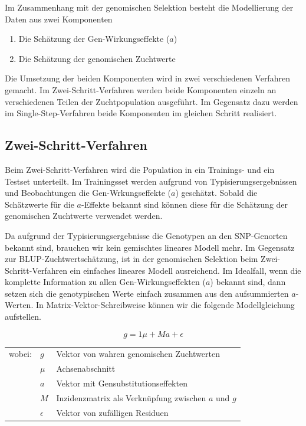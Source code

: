 \documentclass[]{book}
\providecommand{\tightlist}{%
  \setlength{\itemsep}{0pt}\setlength{\parskip}{0pt}}
\begin{document}
Im Zusammenhang mit der genomischen Selektion besteht die Modellierung
der Daten aus zwei Komponenten

\begin{enumerate}
\def\labelenumi{\arabic{enumi}.}
\tightlist
\item
  Die Schätzung der Gen-Wirkungseffekte (\(a\))
\item
  Die Schätzung der genomischen Zuchtwerte
\end{enumerate}

Die Umsetzung der beiden Komponenten wird in zwei verschiedenen
Verfahren gemacht. Im Zwei-Schritt-Verfahren werden beide Komponenten
einzeln an verschiedenen Teilen der Zuchtpopulation ausgeführt. Im
Gegensatz dazu werden im Single-Step-Verfahren beide Komponenten im
gleichen Schritt realisiert.

\subsection{Zwei-Schritt-Verfahren}\label{zwei-schritt-verfahren}

Beim Zwei-Schritt-Verfahren wird die Population in ein Trainings- und
ein Testset unterteilt. Im Trainingsset werden aufgrund von
Typisierungsergebnissen und Beobachtungen die Gen-Wrkungseffekte (\(a\))
geschätzt. Sobald die Schätzwerte für die \(a\)-Effekte bekannt sind
können diese für die Schätzung der genomischen Zuchtwerte verwendet
werden.

Da aufgrund der Typisierungsergebnisse die Genotypen an den SNP-Genorten
bekannt sind, brauchen wir kein gemischtes lineares Modell mehr. Im
Gegensatz zur BLUP-Zuchtwertschätzung, ist in der genomischen Selektion
beim Zwei-Schritt-Verfahren ein einfaches lineares Modell ausreichend.
Im Idealfall, wenn die komplette Information zu allen
Gen-Wirkungseffekten (\(a\)) bekannt sind, dann setzen sich die
genotypischen Werte einfach zusammen aus den aufsummierten \(a\)-Werten.
In Matrix-Vektor-Schreibweise können wir die folgende Modellgleichung
aufstellen.

\begin{equation}
  g = 1\mu + Ma + \epsilon
\end{equation}

\begin{tabular}{lll}
wobei:  &  $g$         &  Vektor von wahren genomischen Zuchtwerten \\
        &  $\mu$       &  Achsenabschnitt \\
        &  $a$         &  Vektor mit Gensubstitutionseffekten \\
        &  $M$         &  Inzidenzmatrix als Verknüpfung zwischen $a$ und $g$ \\
        &  $\epsilon$  &  Vektor von zufälligen Residuen 
\end{tabular}
\end{document}
